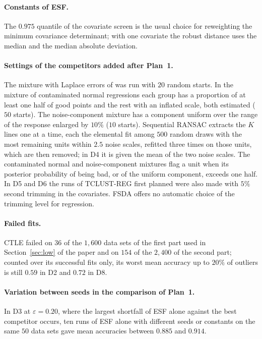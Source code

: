 \paragraph{Constants of ESF.} The $0.975$ quantile of the covariate screen is the usual
choice for reweighting the minimum covariance determinant; with one covariate the robust
distance uses the median and the median absolute deviation.

\paragraph{Settings of the competitors added after Plan~1.} The mixture with Laplace errors
of \citet{song2014robust} was run with $20$ random starts. In the mixture of contaminated normal
regressions each group has a proportion of at least one half of good points and the rest with
an inflated scale, both estimated ($50$ starts). The noise-component mixture has a component
uniform over the range of the response enlarged by $10\%$ ($10$ starts). Sequential RANSAC
extracts the $K$ lines one at a time, each the elemental fit among $500$ random draws with the
most remaining units within $2.5$ noise scales, refitted three times on those units, which are
then removed; in D4 it is given the mean of the two noise scales. The contaminated normal and
noise-component mixtures flag a unit when its posterior probability of being bad, or of the
uniform component, exceeds one half.
In D5 and D6 the runs of TCLUST-REG first planned were also made with $5\%$ second trimming in
the covariates. FSDA offers no automatic choice of the trimming level for regression.

\paragraph{Failed fits.} CTLE failed on $36$ of the $1{,}600$ data sets of the first part used
in Section~\ref{sec:low} of the paper and on $154$ of the $2{,}400$ of the second part; counted over its
successful fits only, its worst mean accuracy up to $20\%$ of outliers is still $0.59$ in D2 and
$0.72$ in D8.

\paragraph{Variation between seeds in the comparison of Plan~1.} In D3 at $\varepsilon=0.20$,
where the largest shortfall of ESF alone against the best competitor occurs, ten runs of
ESF alone with different seeds or constants on the same $50$ data sets gave mean accuracies
between $0.885$ and $0.914$.

